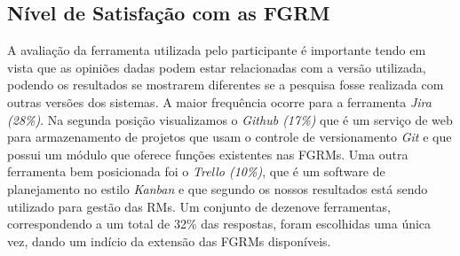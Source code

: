 \begin{table}[htpb]
\centering
{}
\caption{Tamanho da equipe dos participantes}\label{tab:melhorias_fgrm_tamanho_equipe}
\end{table}


\subsection{Nível de Satisfação com as FGRM}\label{sub:nivel_de_satisfação_com_as_fgrm}

A avaliação da ferramenta utilizada pelo participante é importante tendo em
vista que as opiniões dadas podem estar relacionadas com a versão utilizada,
podendo os resultados se mostrarem diferentes se a pesquisa fosse realizada com
outras versões dos sistemas. A maior frequência ocorre para a ferramenta
\textit{Jira (28\%)}. Na segunda posição visualizamos o \textit{Github (17\%)}
que é um serviço de web para armazenamento de projetos que usam o controle de
versionamento \textit{Git} e que possui um módulo que oferece funções
existentes nas FGRMs. Uma outra ferramenta bem posicionada foi o \textit{Trello
    (10\%)}, que é um software de planejamento no estilo \textit{Kanban} e que
segundo os nossos resultados está sendo utilizado para gestão das RMs. Um
conjunto de dezenove ferramentas, correspondendo a um total de 32\% das
respostas, foram escolhidas uma única vez, dando um indício da extensão das
FGRMs disponíveis.


